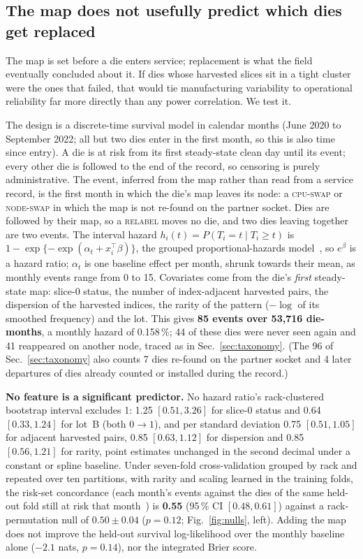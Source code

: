 \documentclass[10pt,conference]{IEEEtran}
\begin{document}
\subsection{The map does not usefully predict which dies get replaced}
\label{sec:reliability}
The map is set before a die enters service; replacement is what the field eventually
concluded about it. If dies whose harvested slices sit in a tight cluster were the ones that
failed, that would tie manufacturing variability to operational reliability far more directly
than any power correlation. We test it.

The design is a discrete-time survival model in calendar months (June 2020 to September 2022; all
but two dies enter in the first month, so this is also time since entry). A die is at risk from
its first steady-state clean day until its event; every other die is followed to the end of the
record, so censoring is purely administrative. The event, inferred from the map rather than read
from a service record, is the first month in which the die's map leaves its node: a
\textsc{cpu-swap} or \textsc{node-swap} in which the map is not re-found on the partner socket.
Dies are followed by their map, so a \textsc{relabel} moves no die, and two dies leaving together
are two events. The interval hazard $h_i(t)=P(T_i{=}t\mid T_i{\ge}t)$ is
$1-\exp\{-\exp(\alpha_t+x_i^{\top}\beta)\}$, the grouped proportional-hazards
model~\cite{prentice1978grouped}, so $e^{\beta}$ is a hazard ratio; $\alpha_t$ is one baseline
effect per month, shrunk towards their mean, as monthly events range from 0 to 15. Covariates
come from the die's \emph{first} steady-state map: slice-0 status, the number of index-adjacent
harvested pairs, the dispersion of the harvested indices, the rarity of the pattern ($-\log$ of
its smoothed frequency) and the lot. This gives \textbf{85 events over 53{,}716 die-months}, a
monthly hazard of 0.158\,\%; 44 of these dies were never seen again and 41 reappeared on another
node, traced as in Sec.~\ref{sec:taxonomy}. (The 96 of Sec.~\ref{sec:taxonomy} also counts 7 dies
re-found on the partner socket and 4 later departures of dies already counted or installed during
the record.)

\textbf{No feature is a significant predictor.} No hazard ratio's rack-clustered bootstrap interval
excludes 1: 1.25 $[0.51,3.26]$ for slice-0 status and 0.64 $[0.33,1.24]$ for lot~B (both $0{\to}1$),
and per standard deviation 0.75 $[0.51,1.05]$ for adjacent harvested pairs, 0.85 $[0.63,1.12]$ for
dispersion and 0.85 $[0.56,1.21]$ for rarity, point estimates unchanged in the second decimal
under a constant or spline baseline. Under seven-fold cross-validation grouped by rack and repeated over ten
partitions, with rarity and scaling learned in the training folds, the risk-set concordance (each
month's events against the dies of the same held-out fold still at risk that
month~\cite{heagerty2005survival}) is \textbf{0.55} (95\,\% CI $[0.48,0.61]$) against a
rack-permutation null of $0.50\pm0.04$ ($p=0.12$; Fig.~\ref{fig:nulls}, left). Adding the map does
not improve the held-out survival log-likelihood over the monthly baseline alone ($-2.1$ nats,
$p=0.14$), nor the integrated Brier score.
\end{document}
